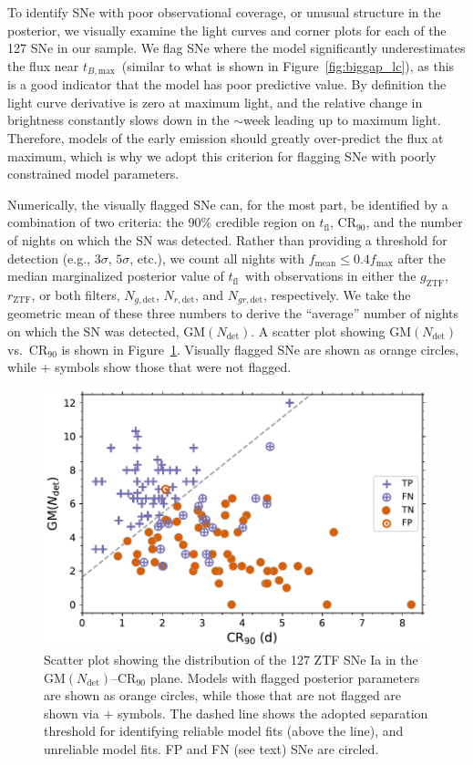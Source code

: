 \documentclass[twocolumn]{./aastex63}
\newcommand{\rztf}{$r_\mathrm{ZTF}$}
\newcommand{\gztf}{$g_\mathrm{ZTF}$}
\newcommand{\tfl}{$t_\mathrm{fl}$}
\newcommand{\tbmax}{$t_{B,\mathrm{max}}$}
\begin{document}
To identify SNe with poor observational coverage, or unusual structure in the
posterior, we visually examine the light curves and corner plots for each of
the 127 SNe in our sample. We flag SNe where the model significantly
underestimates the flux near \tbmax\ (similar to what is shown in
Figure~\ref{fig:biggap_lc}), as this is a good indicator that the model has
poor predictive value. By definition the light curve derivative is zero at
maximum light, and the relative change in brightness constantly slows down in
the $\sim$week leading up to maximum light. Therefore, models of the early
emission should greatly over-predict the flux at maximum, which is why we
adopt this criterion for flagging SNe with poorly constrained model
parameters.

Numerically, the visually flagged SNe can, for the most part, be identified
by a combination of two criteria: the 90\% credible region on \tfl,
$\mathrm{CR}_{90}$, and the number of nights on which the SN was detected.
Rather than providing a threshold for detection (e.g., $3\sigma$, $5\sigma$,
etc.), we count all nights with $f_\mathrm{mean} \le 0.4 f_\mathrm{max}$
after the median marginalized posterior value of \tfl\ with observations in
either the \gztf, \rztf, or both filters, $N_{g, \mathrm{det}}$, $N_{r,
\mathrm{det}}$, and $N_{gr, \mathrm{det}}$, respectively. We take the
geometric mean of these three numbers to derive the ``average'' number of
nights on which the SN was detected, $\mathrm{GM}(N_\mathrm{det})$. A scatter
plot showing $\mathrm{GM}(N_\mathrm{det})$ vs.\ $\mathrm{CR}_{90}$ is shown
in Figure~\ref{fig:flagged_sn}. Visually flagged SNe are shown as orange
circles, while $+$ symbols show those that were not flagged.

\begin{figure}
    \centering
    \includegraphics[width=5in]{./figures/final_sample.pdf}
    \caption{Scatter plot showing the distribution of the 127 ZTF SNe Ia in
    the $\mathrm{GM}(N_\mathrm{det})$--$\mathrm{CR}_{90}$ plane. Models with
    flagged posterior parameters are shown as orange circles, while those
    that are not flagged are shown via $+$ symbols. The dashed line shows the
    adopted separation threshold for identifying reliable model fits (above
    the line), and unreliable model fits. FP and FN (see text) SNe are
    circled. }
    \label{fig:flagged_sn}
\end{figure}
\end{document}
